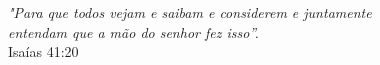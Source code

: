 \begin{epigrafe}
\vspace*{\fill}
\begin{flushright}
\emph{"Para que todos vejam e saibam e considerem e juntamente 
\\ entendam que a mão do senhor fez isso”.}
\\ Isaías 41:20
\end{flushright}
\end{epigrafe}